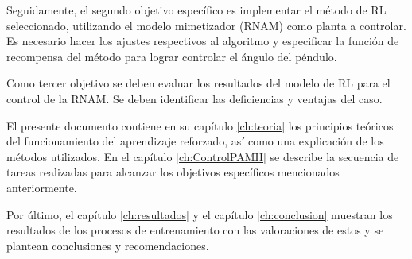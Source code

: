 Seguidamente, el segundo objetivo específico es implementar el método de RL seleccionado, utilizando el modelo mimetizador (RNAM) como planta a controlar. Es necesario hacer los ajustes respectivos al algoritmo y especificar la función de recompensa del método para lograr controlar el ángulo del péndulo.

Como tercer objetivo se deben evaluar los resultados del modelo de RL para el control de la RNAM. Se deben identificar las deficiencias y ventajas del caso.

El presente documento contiene en su capítulo \ref{ch:teoria} los principios teóricos del funcionamiento del aprendizaje reforzado, así como una explicación de los métodos utilizados. En el capítulo \ref{ch:ControlPAMH} se describe la secuencia de tareas realizadas para alcanzar los objetivos específicos mencionados anteriormente.

Por último, el capítulo \ref{ch:resultados} y el capítulo \ref{ch:conclusion} muestran los resultados de los procesos de entrenamiento con las valoraciones de estos y se plantean conclusiones y recomendaciones.









